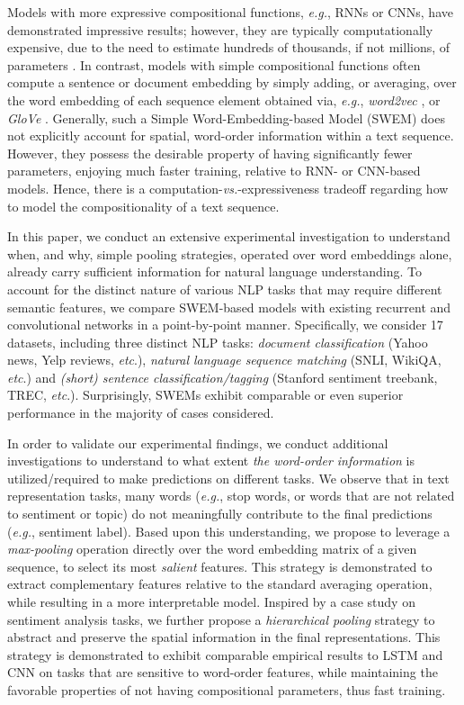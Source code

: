 \documentclass[11pt,a4paper]{article}
\begin{document}
Models with more expressive compositional functions, \emph{e.g.}, RNNs or CNNs, have demonstrated impressive results; however, they are typically computationally expensive, due to the need to estimate hundreds of thousands, if not millions, of parameters \citep{parikh2016decomposable}.
In contrast, models with simple compositional functions often compute a sentence or document embedding by simply adding, or averaging, over the word embedding of each sequence element obtained via, \emph{e.g.}, \emph{word2vec} \citep{mikolov2013distributed}, or \emph{GloVe} \citep{pennington2014glove}.
Generally, such a Simple Word-Embedding-based Model (SWEM) does not explicitly account for spatial, word-order information within a text sequence.
However, they possess the desirable property of having significantly fewer parameters, enjoying much faster training, relative to RNN- or CNN-based models.
Hence, there is a computation-\emph{vs.}-expressiveness tradeoff regarding how to model the compositionality of a text sequence.

In this paper, we conduct an extensive experimental investigation to understand when, and why, simple pooling strategies, operated over word embeddings alone, already carry sufficient information for natural language understanding.
To account for the distinct nature of various NLP tasks that may require different semantic features, we compare SWEM-based models with existing recurrent and convolutional networks in a point-by-point manner.
Specifically, we consider 17 datasets, including three distinct NLP tasks: \emph{document classification} (Yahoo news, Yelp reviews, \emph{etc}.), \emph{natural language sequence matching} (SNLI, WikiQA, \emph{etc}.) and \emph{(short) sentence classification/tagging} (Stanford sentiment treebank, TREC, \emph{etc}.). Surprisingly, SWEMs exhibit comparable or even superior performance in the majority of cases considered.

In order to validate our experimental findings, we conduct additional investigations to understand to what extent \emph{the word-order information} is utilized/required to make predictions on different tasks. We observe that in text representation tasks, many words (\emph{e.g.}, stop words, or words that are not related to sentiment or topic) do not meaningfully contribute to the final predictions (\emph{e.g.}, sentiment label). Based upon this understanding, we propose to leverage a \emph{max-pooling} operation directly over the word embedding matrix of a given sequence, to select its most \emph{salient} features.
This strategy is demonstrated to extract complementary features relative to the standard averaging operation, while resulting in a more interpretable model.
Inspired by a case study on sentiment analysis tasks, we further propose a \emph{hierarchical pooling} strategy to abstract and preserve the spatial information in the final representations.
This strategy is demonstrated to exhibit comparable empirical results to LSTM and CNN on tasks that are sensitive to word-order features, while maintaining the favorable properties of not having compositional parameters, thus fast training.
\end{document}

